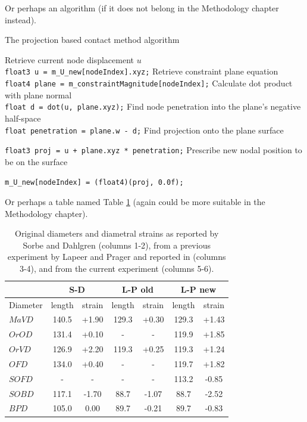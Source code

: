 \documentclass[a4paper, oneside, 11pt]{report}
\newcommand{\mi}{\mathit}
\begin{document}
Or perhaps an algorithm (if it does not belong in the Methodology chapter instead).

\begin{algorithm}[th]
\caption{ The projection based contact method algorithm }
\begin{algorithmic}[1]
\STATE Retrieve current node displacement $u$
\\ \texttt{float3 u = m\_U\_new[nodeIndex].xyz;}
\STATE Retrieve constraint plane equation
\\ \texttt{float4 plane = m\_constraintMagnitude[nodeIndex];}
\STATE Calculate dot product with plane normal
\\ \texttt{float d = dot(u, plane.xyz);}
\STATE Find node penetration into the plane's negative half-space
\\ \texttt{float penetration = plane.w - d;}
	\STATE Find projection onto the plane surface
	
	\texttt{float3 proj = u + plane.xyz * penetration;}
	\STATE Prescribe new nodal position to be on the surface
	
	\texttt{m\_U\_new[nodeIndex] = (float4)(proj, 0.0f);}
\ENDIF
\end{algorithmic}
\end{algorithm}

Or perhaps a table named Table \ref{Res01} (again could be more suitable in the Methodology chapter).

\begin{table}[h]
\caption[]{Original diameters and diametral strains as reported by
  Sorbe and Dahlgren \cite{Sorbe:1983} (columns 1-2), from a previous 
  experiment by Lapeer and Prager and reported in \cite{Lapeer:2001}
  (columns 3-4), and from the current experiment (columns 5-6).}
\begin{center}
\begin{tabular}{|l|c|c||c|c||c|c|}\hline
& \multicolumn{2}{c||}{S-D} & \multicolumn{2}{c||}{L-P old} & \multicolumn{2}{c|}{L-P new} \\ \hline
Diameter & length & strain & length & strain & length & strain \\ \hline
$\mi{MaVD}$ & 140.5 & +1.90 & 129.3 & +0.30 & 129.3 & +1.43 \\
$\mi{OrOD}$ & 131.4 & +0.10 &   -   &  -    & 119.9 & +1.85 \\
$\mi{OrVD}$ & 126.9 & +2.20 & 119.3 & +0.25 & 119.3 & +1.24 \\
$\mi{OFD}$  & 134.0 & +0.40 &  -    &   -   & 119.7 & +1.82 \\ 
$\mi{SOFD}$ &  -    &   -   &  -    &   -   & 113.2 & -0.85 \\
$\mi{SOBD}$ & 117.1 & -1.70 &  88.7 & -1.07 &  88.7 & -2.52 \\
$\mi{BPD}$  & 105.0 &  0.00 &  89.7 & -0.21 &  89.7 & -0.83 \\ \hline
\end{tabular}
\label{Res01}
\end{center}
\end{table}
\end{document}

